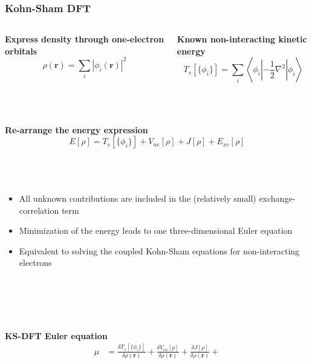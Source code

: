 \documentclass[mathserif, 8pt]{beamer}
\begin{document}
\begin{frame}
    \frametitle{Kohn-Sham DFT}
    \begin{columns}
    \begin{column}{.50\textwidth}
    \centering
    \textbf{Express density through one-electron orbitals}
    \begin{equation}
	\nonumber
	\rho(\boldsymbol{r}) = \sum_i |\phi_i(\boldsymbol{r})|^2
    \end{equation}
    \end{column}
    \begin{column}{.50\textwidth}
    \centering
    \textbf{Known non-interacting kinetic energy}
    \begin{equation}
	\nonumber
	T_s[\lbrace\phi_i\rbrace] = \sum_i \left<\phi_i\left|-\frac{1}{2}\nabla^2\right|\phi_i\right>
    \end{equation}
    \end{column}
    \end{columns}
    \ \\
    \ \\
    \centering
    \textbf{Re-arrange the energy expression}
    \begin{equation}
	\nonumber
	E[\rho] = T_s[\lbrace\phi_i\rbrace] + V_{ne}[\rho] + J[\rho] + E_{xc}[\rho]
    \end{equation}
    \ \\
    \ \\
    \ \\
    \begin{itemize}
	\item	All unknown contributions are included in the (relatively small) exchange-correlation term
	\item	Minimization of the energy leads to one three-dimensional Euler equation
	\item	Equivalent to solving the coupled Kohn-Sham equations for non-interacting electrons
    \end{itemize}
    \ \\
    \ \\
    \ \\
    \begin{columns}
    \begin{column}{.50\textwidth}
    \centering
    \textbf{KS-DFT Euler equation}
    \begin{align}
	\nonumber
	\mu &=
	\frac{\delta T_s[\lbrace\phi_i\rbrace]}{\delta \rho(\boldsymbol{r})} + 
	\frac{\delta V_{en}[\rho]}{\delta \rho(\boldsymbol{r})} + 
	\frac{\delta J[\rho]}{\delta \rho(\boldsymbol{r})} + 

\end{align}
\end{column}
\end{columns}
\end{frame}
\end{document}
